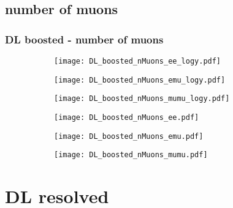 \documentclass[aspectratio=169,8pt]{beamer}
\begin{document}
\subsection{number of muons}
\begin{frame}
\frametitle{DL boosted - number of muons}
\begin{figure}
\captionsetup[subfigure]{labelformat=empty}
\begin{subfigure}{0.32\textwidth}
\texttt{[image: DL\_boosted\_nMuons\_ee\_logy.pdf]}
\vspace*{-0.15cm}
\end{subfigure}
\hfil
\begin{subfigure}{0.32\textwidth}
\texttt{[image: DL\_boosted\_nMuons\_emu\_logy.pdf]}
\vspace*{-0.15cm}
\end{subfigure}
\hfil
\begin{subfigure}{0.32\textwidth}
\texttt{[image: DL\_boosted\_nMuons\_mumu\_logy.pdf]}
\vspace*{-0.15cm}
\end{subfigure}
\hfil
\begin{subfigure}{0.32\textwidth}
\texttt{[image: DL\_boosted\_nMuons\_ee.pdf]}
\vspace*{-0.15cm}
\end{subfigure}
\hfil
\begin{subfigure}{0.32\textwidth}
\texttt{[image: DL\_boosted\_nMuons\_emu.pdf]}
\vspace*{-0.15cm}
\end{subfigure}
\hfil
\begin{subfigure}{0.32\textwidth}
\texttt{[image: DL\_boosted\_nMuons\_mumu.pdf]}
\vspace*{-0.15cm}
\end{subfigure}
\hfil
\end{figure}
\end{frame}
\newpage

\section{DL resolved}
\end{document}
